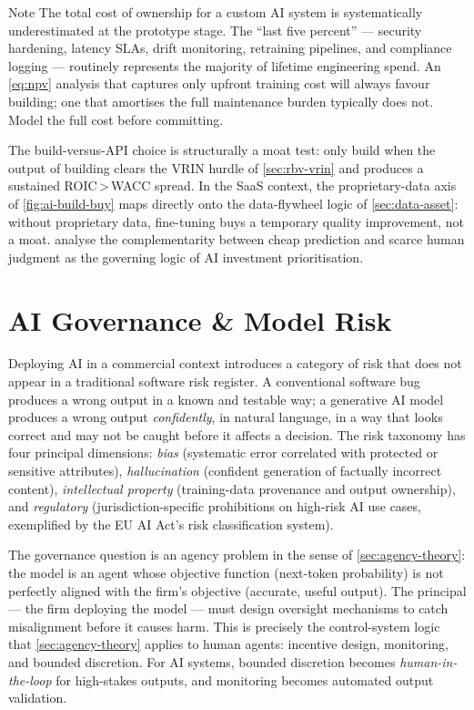 \begin{admonition}{Note}
The total cost of ownership for a custom AI system is systematically underestimated at the
prototype stage. The ``last five percent'' — security hardening, latency SLAs, drift monitoring,
retraining pipelines, and compliance logging — routinely represents the majority of lifetime
engineering spend. An \cref{eq:npv} analysis that captures only upfront training cost will
always favour building; one that amortises the full maintenance burden typically does not.
Model the full cost before committing.
\end{admonition}

The build-versus-API choice is structurally a moat test: only build when the output of building
clears the VRIN hurdle of \cref{sec:rbv-vrin} and produces a sustained ROIC\,>\,WACC spread.
In the SaaS context, the proprietary-data axis of \cref{fig:ai-build-buy} maps directly onto
the data-flywheel logic of \cref{sec:data-asset}: without proprietary data, fine-tuning buys
a temporary quality improvement, not a moat. \textcite{agrawal2018prediction} analyse the
complementarity between cheap prediction and scarce human judgment as the governing logic of
AI investment prioritisation.

\section{AI Governance \& Model Risk}\label{sec:ai-governance}

Deploying AI in a commercial context introduces a category of risk that does not appear in a
traditional software risk register. A conventional software bug produces a wrong output in a
known and testable way; a generative AI model produces a wrong output \emph{confidently}, in
natural language, in a way that looks correct and may not be caught before it affects a decision.
The risk taxonomy has four principal dimensions: \emph{bias} (systematic error correlated with
protected or sensitive attributes), \emph{hallucination} (confident generation of factually
incorrect content), \emph{intellectual property} (training-data provenance and output ownership),
and \emph{regulatory} (jurisdiction-specific prohibitions on high-risk AI use cases, exemplified
by the EU AI Act's risk classification system).

The governance question is an agency problem in the sense of \cref{sec:agency-theory}: the model
is an agent whose objective function (next-token probability) is not perfectly aligned with the
firm's objective (accurate, useful output). The principal — the firm deploying the model — must
design oversight mechanisms to catch misalignment before it causes harm. This is precisely the
control-system logic that \cref{sec:agency-theory} applies to human agents: incentive design,
monitoring, and bounded discretion. For AI systems, bounded discretion becomes \emph{human-in-the-loop}
for high-stakes outputs, and monitoring becomes automated output validation.

